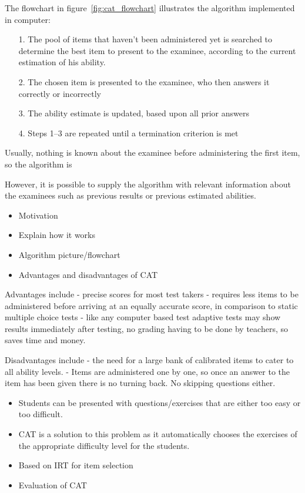 The flowchart in figure~\ref{fig:cat_flowchart} illustrates the algorithm implemented in computer:
\begin{itemize}
\item[1.] The pool of items that haven't been administered yet is searched to determine the best item to present to the examinee, according to the current estimation of his ability.
\item[2.] The chosen item is presented to the examinee, who then answers it correctly or incorrectly
\item[3.] The ability estimate is updated, based upon all prior answers
\item[4.] Steps 1–3 are repeated until a termination criterion is met
\end{itemize}

Usually, nothing is known about the examinee before administering the first item, so the algorithm is 

 However, it is possible to supply the algorithm with relevant information about the examinees such as previous results or previous estimated abilities.

\begin{itemize}
\item Motivation
\item Explain how it works
\item Algorithm picture/flowchart
\item Advantages and disadvantages of CAT
\end{itemize}

Advantages include
- precise scores for most test takers
- requires less items to be administered before arriving at an equally accurate score, in comparison to static multiple choice tests
- like any computer based test adaptive tests may show results immediately after testing, no grading having to be done by teachers, so saves time and money.

Disadvantages include 
- the need for a large bank of calibrated items to cater to all ability levels.
- Items are administered one by one, so once an answer to the item has been given there is no turning back. No skipping questions either.


\begin{itemize}
\item Students can be presented with questions/exercises that are either too easy or too difficult.
\item CAT is a solution to this problem as it automatically chooses the exercises of the appropriate difficulty level for the students.
\item Based on IRT for item selection
\item Evaluation of CAT
\end{itemize}

